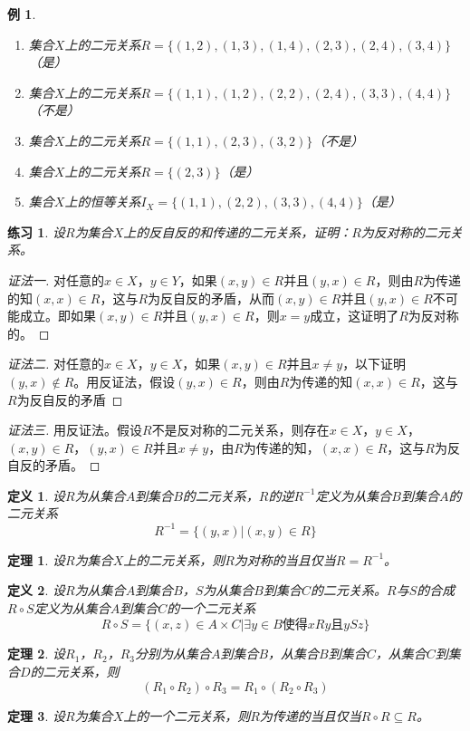 \documentclass{book}[oneside]
\newtheorem{Def}{定义}[chapter]
\newtheorem{Thm}{定理}[chapter]
\newtheorem{Exercise}{练习}[chapter]
\newtheorem{Example}{例}[chapter]
\begin{document}
\begin{CJK*}{UTF8}{gbsn}
\begin{Example}
  \begin{enumerate}
  \item 集合$X$上的二元关系$R=\{(1,2), (1,3), (1,4), (2,3),
    (2,4), (3,4)\}$（是）
  \item 集合$X$上的二元关系$R=\{(1,1), (1,2), (2,2),
    (2,4), (3,3), (4,4)\}$（不是）
  \item 集合$X$上的二元关系$R = \{(1,1), (2,3), (3,2)\}$（不是）
  \item 集合$X$上的二元关系$R = \{(2,3)\}$（是）
  \item 集合$X$上的恒等关系$I_X = \{(1,1), (2,2), (3,3),(4,4)\}$（是）
  \end{enumerate}
\end{Example}
\begin{Exercise}
  设$R$为集合$X$上的反自反的和传递的二元关系，证明：$R$为反对称的二元关系。  
  \end{Exercise}
  \begin{proof}[证法一]对任意的$x\in X$，$y\in Y$，如果$(x,y)\in R$并且$(y,x)\in R$，则由$R$为传递的知$(x,x)\in R$，这与$R$为反自反的矛盾，从而$(x,y)\in R$并且$(y,x)\in R$不可能成立。即如果$(x,y)\in R$并且$(y,x)\in R$，则$x=y$成立，这证明了$R$为反对称的。
    
  \end{proof}
  \begin{proof}[证法二]
   对任意的$x\in X$，$y\in X$，如果$(x,y)\in R$并且$x\neq y$，以下证明$(y,x)\notin R$。用反证法，假设$(y,x)\in R$，则由$R$为传递的知$(x,x)\in R$，这与$R$为反自反的矛盾 
  \end{proof}
  \begin{proof}[证法三]
    用反证法。假设$R$不是反对称的二元关系，则存在$x\in X$，$y\in X$，$(x,y)\in R$，$(y,x)\in R$并且$x\neq y$，由$R$为传递的知，$(x,x)\in R$，这与$R$为反自反的矛盾。
  \end{proof}

\begin{Def}
    设$R$为从集合$A$到集合$B$的二元关系，$R$的逆$R^{-1}$定义为从集合$B$到集合$A$的二元关系
    \[R^{-1}=\{(y,x)|(x,y)\in R\}\]
  \end{Def}
  \begin{Thm}
    设$R$为集合$X$上的二元关系，则$R$为对称的当且仅当$R=R^{-1}$。
  \end{Thm}  

    \begin{Def}
    设$R$为从集合$A$到集合$B$，$S$为从集合$B$到集合$C$的二元关系。$R$与$S$的合成
    $R\circ S$定义为从集合$A$到集合$C$的一个二元关系
    \[R\circ S = \{(x,z)\in A \times C |  \exists y \in B \text{使得} xRy \text{且} ySz\}\]
  \end{Def}
    \begin{Thm}
    设$R_1$，$R_2$，$R_3$分别为从集合$A$到集合$B$，从集合$B$到集合$C$，从集合$C$到集合$D$的二元关系，则
    \[(R_1 \circ R_2)\circ R_3 = R_1 \circ (R_2 \circ R_3)\]
  \end{Thm}
  \begin{Thm}
    设$R$为集合$X$上的一个二元关系，则$R$为传递的当且仅当$R\circ R \subseteq R$。
  \end{Thm}


\end{CJK*}
\end{document}
